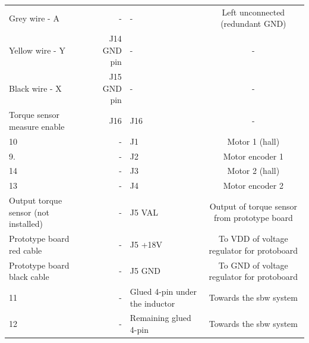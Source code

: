 \begin{table}[h!]
{\begin{tabular}{lrlc}
            Grey wire - A                            & -                        & -                               & Left unconnected (redundant GND) \\
            Yellow wire - Y                          & J14 GND pin              & -                               & - \\
            Black wire - X                           & J15 GND pin              & -                               & - \\
            Torque sensor measure enable             & J16                      & J16                             & - \\
            10                                       & -                        & J1                              & Motor 1 (hall) \\
            9.                                       & -                        & J2                              & Motor encoder 1 \\
            14                                       & -                        & J3                              & Motor 2 (hall) \\
            13                                       & -                        & J4                              & Motor encoder 2 \\
            Output torque sensor (not installed)     & -                        & J5 VAL                          & Output of torque sensor from prototype board \\
            Prototype board red cable                & -                        & J5 +18V                         & To VDD of voltage regulator for protoboard \\
            Prototype board black cable              & -                        & J5 GND                          & To GND of voltage regulator for protoboard \\
            11                                       & -                        & Glued 4-pin under the inductor  & Towards the sbw system \\
            12                                       & -                        & Remaining glued 4-pin           & Towards the sbw system \\
            \bottomrule
        \end{tabular}
    }
    \label{tab:mc_power}
\end{table}

\clearpage
